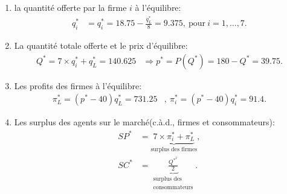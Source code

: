 \documentclass[notes, ignorenonframetext, compress, 10pt, xcolor=svgnames, aspectratio=169]{beamer}
\begin{document}
\begin{frame}[allowframebreaks]{\insertsection}
\begin{enumerate}[$\star$]
\begin{enumerate}[$\star$]
               \item la quantité offerte par la firme $i$ à l'équilibre: 
               \begin{align*}
                q_i^* &= q_i^* = 18.75 -\frac{q_L^*}{8} =9.375, \ \text{pour} \ i=1, \ldots, 7.
               \end{align*}
               \item La quantité totale offerte et le prix d'équilibre:
               \begin{align*}
                Q^* = 7\times q_i^* + q_L^* = 140.625 &\Rightarrow p^* = P(Q^*) = 180-Q^* = 39.75.
               \end{align*}
               \item Les profits des firmes à l'équilibre:
               \begin{align*}
               \pi_L^* = (p^* - 40)q_L^* = 731.25&, \ \pi_i^* = (p^* - 40)q_i^* = 91.4.
               \end{align*}
               \item  Les surplus des agents sur le marché(c.à.d., firmes et consommateurs):
               \begin{align*}
                   SP^* &= \underbrace{7\times \pi_i^* + \pi_L^*}_{\text{surplus des firmes}} ,\\ 
                   SC^* &=  \underbrace{\frac{Q^{*^2}}{2}}_{\substack{\text{surplus des }\\
                   \text{consommateurs}}}.
               \end{align*}
            
             \end{enumerate}
            \end{enumerate}
            
\end{frame}
\end{document}
